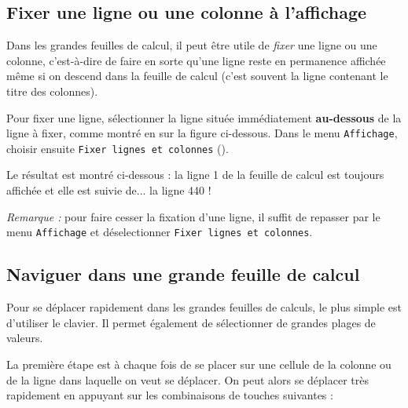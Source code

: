 
\subsection{Fixer une ligne ou une colonne à l'affichage}\label{Calc3fixer} 

Dans les grandes feuilles de calcul, il peut être utile de \emph{fixer} une ligne ou une colonne, c'est-à-dire de faire en sorte qu'une ligne reste en permanence affichée même si on descend dans la feuille de calcul (c'est souvent la ligne contenant le titre des colonnes).

\vspace{1em}

Pour fixer une ligne, sélectionner la ligne située immédiatement \textbf{au-dessous} de la ligne à fixer, comme montré en  sur la figure ci-dessous. Dans le menu \texttt{Affichage}, choisir ensuite \texttt{Fixer lignes et colonnes} ().


Le résultat est montré ci-dessous : la ligne 1 de la feuille de calcul est toujours affichée et elle est suivie de... la ligne 440 !



\emph{Remarque :} pour faire cesser la fixation d'une ligne, il suffit de repasser par le menu \texttt{Affichage} et déselectionner \texttt{Fixer lignes et colonnes}.



\subsection{Naviguer dans une grande feuille de calcul}\label{Calc3navigue} 
Pour se déplacer rapidement dans les grandes feuilles de calculs, le plus simple est d'utiliser le clavier. Il permet également de sélectionner de grandes plages de valeurs.

La première étape est à chaque fois de se placer sur une cellule de la colonne ou de la ligne dans laquelle on veut se déplacer. On peut alors se déplacer très rapidement en appuyant sur les combinaisons de touches suivantes :

